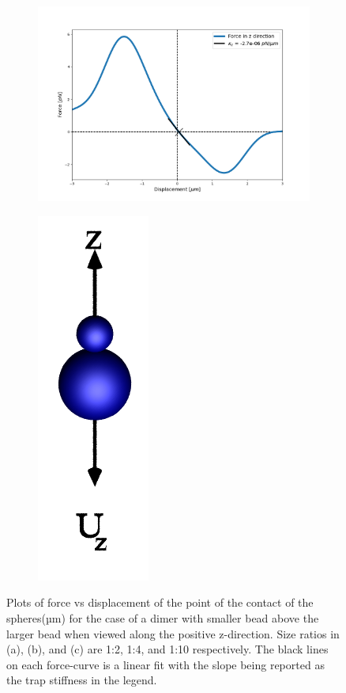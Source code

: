 \documentclass[preprint,  3p]{elsarticle}
\begin{document}
\begin{figure}
	\medskip %
	\begin{subfigure}{.475\linewidth}
		\includegraphics[width=\linewidth]{Images/lam=10_theta=180.png}
		\caption{}
		\label{lam=10_inverted}
	\end{subfigure}\hfill %
	\begin{subfigure}{.29\linewidth}
		\includegraphics[width=0.35\linewidth, keepaspectratio]{Images/theta=180.png}
		\label{small_over_large}
	\end{subfigure}
	\caption{Plots of force vs displacement of the point of the contact of the spheres(µm) for the case of a dimer with smaller bead above the larger bead when viewed along the positive z-direction. Size ratios in (a), (b), and (c) are 1:2, 1:4, and 1:10 respectively. The black lines on each force-curve is a linear fit with the slope being reported as the trap stiffness in the legend.}
\end{figure}
\end{document}
